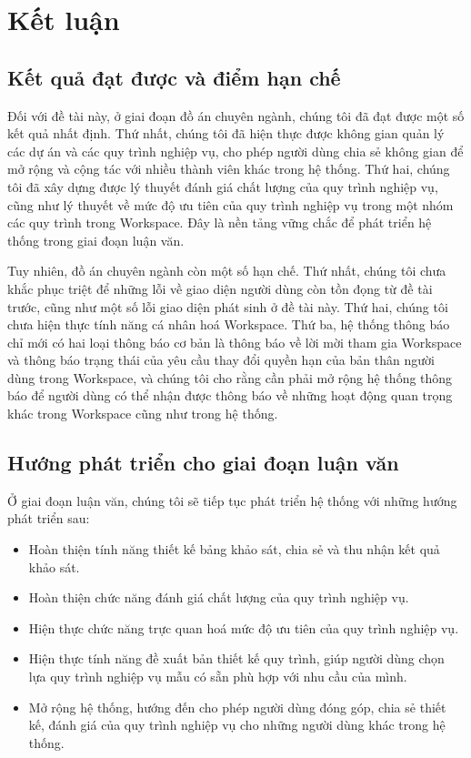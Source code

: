 \chapter{Kết luận}
\section{Kết quả đạt được và điểm hạn chế}
Đối với đề tài này, ở giai đoạn đồ án chuyên ngành, chúng tôi đã đạt được một số kết quả nhất định.
Thứ nhất, chúng tôi đã hiện thực được không gian quản lý các dự án và các quy trình nghiệp vụ, cho phép người dùng chia sẻ không gian 
để mở rộng và cộng tác với nhiều thành viên khác trong hệ thống. Thứ hai, chúng tôi đã xây dựng được lý thuyết đánh giá chất lượng của quy
trình nghiệp vụ, cũng như lý thuyết về mức độ ưu tiên của quy trình nghiệp vụ trong một nhóm các quy trình trong Workspace. Đây là nền tảng
vững chắc để phát triển hệ thống trong giai đoạn luận văn.
\par
Tuy nhiên, đồ án chuyên ngành còn một số hạn chế. Thứ nhất, chúng tôi chưa khắc phục triệt để những lỗi về giao diện người dùng còn tồn
đọng từ đề tài trước, cũng như một số lỗi giao diện phát sinh ở đề tài này. Thứ hai, chúng tôi chưa hiện thực tính năng cá nhân hoá
Workspace. Thứ ba, hệ thống thông báo chỉ mới có hai loại thông báo cơ bản là thông báo về lời mời tham gia Workspace và thông báo trạng thái
của yêu cầu thay đổi quyền hạn của bản thân người dùng trong Workspace, và chúng tôi cho rằng cần phải mở rộng hệ thống thông báo để
người dùng có thể nhận được thông báo về những hoạt động quan trọng khác trong Workspace cũng như trong hệ thống.

\section{Hướng phát triển cho giai đoạn luận văn}
Ở giai đoạn luận văn, chúng tôi sẽ tiếp tục phát triển hệ thống với những hướng phát triển sau:
\begin{itemize}
    \item Hoàn thiện tính năng thiết kế bảng khảo sát, chia sẻ và thu nhận kết quả khảo sát.
    \item Hoàn thiện chức năng đánh giá chất lượng của quy trình nghiệp vụ.
    \item Hiện thực chức năng trực quan hoá mức độ ưu tiên của quy trình nghiệp vụ.
    \item Hiện thực tính năng đề xuất bản thiết kế quy trình, giúp người dùng chọn lựa quy trình nghiệp vụ mẫu có sẵn phù hợp với nhu cầu của mình.
    \item Mở rộng hệ thống, hướng đến cho phép người dùng đóng góp, chia sẻ thiết kế, đánh giá của quy trình nghiệp vụ cho những người dùng khác trong hệ thống.
\end{itemize}

